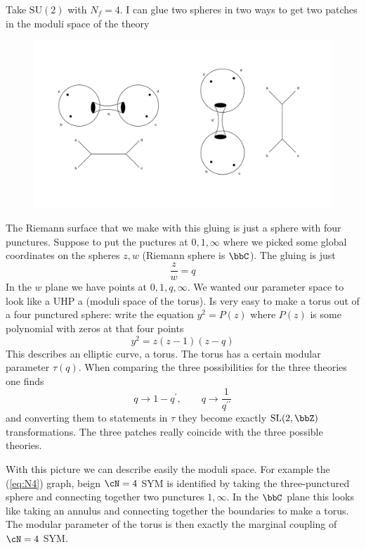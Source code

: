 \documentclass[11pt]{article}
\theoremstyle{definition}
\numberwithin{equation}{section}
\newcommand*\SU{\mathrm{SU}}
\newcommand*\SL{\mathrm{SL}}
\begin{document}
Take $\SU(2)$ with $N_{f}=4$. I can glue two spheres in two ways to get two patches in the moduli space of the theory
\begin{figure}[H]
\includegraphics[width=\textwidth]{su2.pdf}
\end{figure}
The Riemann surface that we make with this gluing is just a sphere with four punctures. Suppose to put the puctures at $0,1,\infty$ where we picked some global coordinates on the spheres $z,w$ (Riemann sphere is $\bbC$). The gluing is just 
\begin{equation}
	\frac{z}{w}=q
\end{equation}
In the $w$ plane we have points at $0,1,q,\infty$. We wanted our parameter space to look like a UHP a (moduli space of the torus). Is very easy to make a torus out of a four punctured sphere: write the equation $y^{2}=P(z)$ where $P(z)$ is some polynomial with zeros at that four points
\begin{equation}
	y^{2}=z(z-1)(z-q)
\end{equation}
This describes an elliptic curve, a torus. The torus has a certain modular parameter $\tau(q)$. When comparing the three possibilities for the three theories one finds
\begin{equation}
	q\rightarrow1-q^{\prime},\qquad q\rightarrow\frac{1}{q^{\prime\prime}}
\end{equation}
and converting them to statements in $\tau$ they become exactly $\SL(2,\bbZ)$ transformations. The three patches really coincide with the three possible theories.

With this picture we can describe easily the moduli space. For example the (\ref{eq:N4}) graph, beign $\cN=4$ SYM is identified by taking the three-punctured sphere and connecting together two punctures $1,\infty$. In the $\bbC$ plane this looks like taking an annulus and connecting together the boundaries to make a torus. The modular parameter of the torus is then exactly the marginal coupling of $\cN=4$ SYM.
\end{document}

